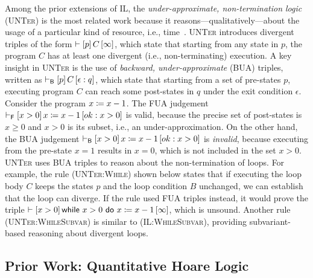 Among the prior extensions of IL, the \emph{under-approximate, non-termination logic} (\textsc{UNTer}) is the most related work because it reasons---qualitatively---about the usage of a particular kind of resource, i.e., time~\cite{OOPSLA:RVO24}.
%
\textsc{UNTer} introduces divergent triples of the form $\vdash\left[p\right]C\left[\infty\right]$, which state that starting from any state in $p$, the program $C$ has at least one divergent (i.e., non-terminating) execution.
%
A key insight in \textsc{UNTer} is the use of \emph{backward, under-approximate} (BUA) triples, written as $\vdash_{\mathsf{B}}\left[p\right]C\left[\epsilon: q\right]$, which state that starting from a set of pre-states $p$, executing program $C$ can reach some post-states in $q$ under the exit condition $\epsilon$.
%
Consider the program $x\coloneqq x-1$.
%
The FUA judgement $\vdash_{\mathsf{F}}\left[x>0\right]x\coloneqq x-1\left[ok: x>0\right]$ is valid, because the precise set of post-states is $x \ge 0$ and $x > 0$ is its subset, i.e., an under-approximation.
%
On the other hand, the BUA judgement $\vdash_{\mathsf{B}}\left[x>0\right]x\coloneqq x-1\left[ok: x > 0\right]$ is \emph{invalid}, because executing from the pre-state $x=1$ results in $x=0$, which is not included in the set $x>0$.
%
\textsc{UNTer} uses BUA triples to reason about the non-termination of loops.
%
For example, the rule \textsc{(UNTer:While)} shown below states that if executing the loop body $C$ keeps the states $p$ and the loop condition $B$ unchanged, we can establish that the loop can diverge.
%
If the rule used FUA triples instead, it would prove the triple $\vdash\left[x > 0\right]\textsf{while}~x>0~\textsf{do}~x\coloneqq x-1\left[\infty\right]$, which is unsound.
%
Another rule \textsc{(UNTer:WhileSubvar)} is similar to \textsc{(IL:WhileSubvar)}, providing subvariant-based reasoning about divergent loops.
%


\subsection{Prior Work: Quantitative Hoare Logic}
\label{sec:overview:qhl}

